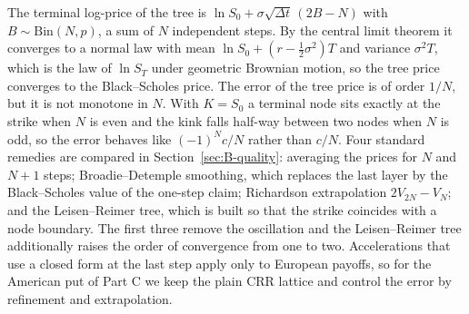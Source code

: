 The terminal log-price of the tree is $\ln S_0+\sigma\sqrt{\Delta t}\,(2B-N)$ with $B\sim\mathrm{Bin}(N,p)$, a sum of $N$ independent steps.
By the central limit theorem it converges to a normal law with mean $\ln S_0+(r-\tfrac12\sigma^2)T$ and variance $\sigma^2T$, which is the law of $\ln S_T$ under geometric Brownian motion, so the tree price converges to the Black--Scholes price.
The error of the tree price is of order $1/N$, but it is not monotone in $N$.
With $K=S_0$ a terminal node sits exactly at the strike when $N$ is even and the kink falls half-way between two nodes when $N$ is odd, so the error behaves like $(-1)^Nc/N$ rather than $c/N$.
Four standard remedies are compared in Section~\ref{sec:B-quality}: averaging the prices for $N$ and $N+1$ steps; Broadie--Detemple smoothing, which replaces the last layer by the Black--Scholes value of the one-step claim; Richardson extrapolation $2V_{2N}-V_N$; and the Leisen--Reimer tree, which is built so that the strike coincides with a node boundary.
The first three remove the oscillation and the Leisen--Reimer tree additionally raises the order of convergence from one to two.
Accelerations that use a closed form at the last step apply only to European payoffs, so for the American put of Part C we keep the plain CRR lattice and control the error by refinement and extrapolation.
